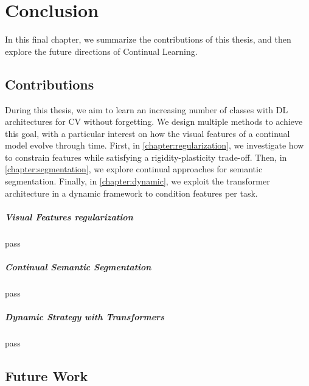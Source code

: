 \chapter{Conclusion}
\label{chapter:conclusion}

{}


In this final chapter, we summarize the contributions of this thesis, and then
explore the future directions of Continual Learning.

\section{Contributions}

During this thesis, we aim to learn an increasing number of classes with \ac{DL} architectures for
\ac{CV} without forgetting. We design multiple methods to achieve this goal, with a particular
interest on how the visual features of a continual model evolve through time. First, in \autoref{chapter:regularization}, we
investigate how to constrain features while satisfying a rigidity-plasticity trade-off.
Then, in \autoref{chapter:segmentation}, we explore continual approaches for
semantic segmentation. Finally, in \autoref{chapter:dynamic}, we exploit the transformer
architecture in a dynamic framework to condition features per task.

\paragraph{Visual Features regularization} pass

\paragraph{Continual Semantic Segmentation} pass

\paragraph{Dynamic Strategy with Transformers} pass



\section{Future Work}


